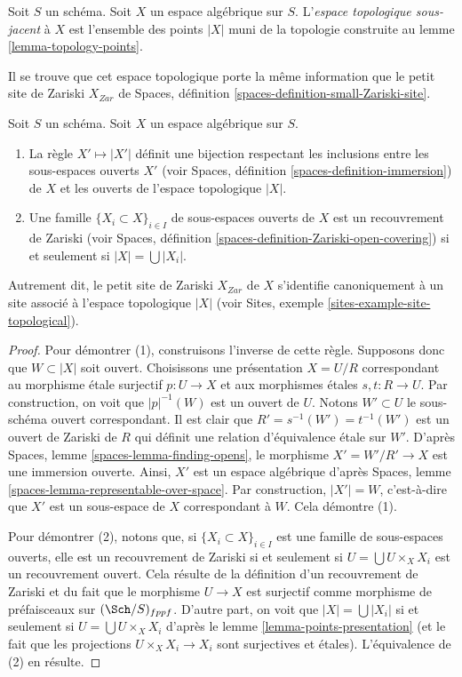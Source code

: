 \begin{definition}
\label{definition-topological-space}
Soit $S$ un schéma. Soit $X$ un espace algébrique sur $S$.
L'{\it espace topologique sous-jacent} à $X$ est l'ensemble des points
$|X|$ muni de la topologie construite au
lemme \ref{lemma-topology-points}.
\end{definition}

\noindent
Il se trouve que cet espace topologique porte la même information
que le petit site de Zariski $X_{Zar}$ de
Spaces, définition \ref{spaces-definition-small-Zariski-site}.

\begin{lemma}
\label{lemma-open-subspaces}
Soit $S$ un schéma.
Soit $X$ un espace algébrique sur $S$.
\begin{enumerate}
\item La règle $X' \mapsto |X'|$ définit une bijection respectant les inclusions
entre les sous-espaces ouverts $X'$ (voir
Spaces, définition \ref{spaces-definition-immersion})
de $X$ et les ouverts de l'espace topologique $|X|$.
\item Une famille $\{X_i \subset X\}_{i \in I}$ de sous-espaces ouverts de $X$
est un recouvrement de Zariski (voir
Spaces, définition \ref{spaces-definition-Zariski-open-covering})
si et seulement si $|X| = \bigcup |X_i|$.
\end{enumerate}
Autrement dit, le petit site de Zariski $X_{Zar}$ de $X$ s'identifie canoniquement
à un site associé à l'espace topologique $|X|$ (voir
Sites, exemple \ref{sites-example-site-topological}).
\end{lemma}

\begin{proof}
Pour démontrer (1), construisons l'inverse de cette règle.
Supposons donc que $W \subset |X|$ soit ouvert. Choisissons une présentation
$X = U/R$ correspondant au morphisme étale surjectif
$p : U \to X$ et aux morphismes étales $s, t : R \to U$.
Par construction, on voit que $|p|^{-1}(W)$ est un
ouvert de $U$. Notons $W' \subset U$ le sous-schéma ouvert correspondant.
Il est clair que $R' = s^{-1}(W') = t^{-1}(W')$ est un ouvert de Zariski
de $R$ qui définit une relation d'équivalence étale sur $W'$.
D'après Spaces, lemme \ref{spaces-lemma-finding-opens}, le morphisme
$X' = W'/R' \to X$ est une immersion ouverte. Ainsi, $X'$ est un espace algébrique
d'après Spaces, lemme \ref{spaces-lemma-representable-over-space}.
Par construction, $|X'| = W$, c'est-à-dire que $X'$ est un sous-espace de $X$
correspondant à $W$. Cela démontre (1).

\medskip\noindent
Pour démontrer (2), notons que, si $\{X_i \subset X\}_{i \in I}$ est une famille
de sous-espaces ouverts, elle est un recouvrement de Zariski si et seulement si
$U = \bigcup U \times_X X_i$ est un recouvrement ouvert. Cela résulte de
la définition d'un recouvrement de Zariski et du fait que le morphisme
$U \to X$ est surjectif comme morphisme de préfaisceaux sur $(\Sch/S)_{fppf}$.
D'autre part, on voit que $|X| = \bigcup |X_i|$ si et seulement si
$U = \bigcup U \times_X X_i$ d'après le lemme \ref{lemma-points-presentation}
(et le fait que les projections $U \times_X X_i \to X_i$ sont surjectives
et étales). L'équivalence de (2) en résulte.
\end{proof}

